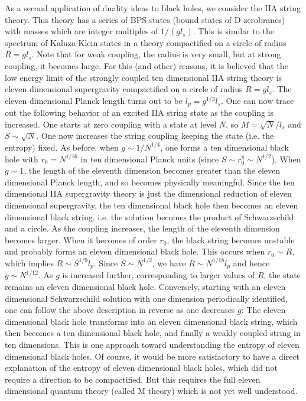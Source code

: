 As a second application of duality ideas to black holes, we consider
the IIA string theory. This theory has a series of BPS states (bound
states of D-zerobranes) with
masses which are integer multiples of $1/(g l_s)$. This is similar to
the spectrum of Kaluza-Klein states in a theory compactified on a 
circle of radius $R = g l_s$. Note that for weak coupling, the radius is very
small, but at strong coupling, it becomes large. For this (and other) 
reasons, it is believed that the low energy limit of the strongly
coupled ten dimensional IIA string theory is eleven dimensional supergravity
compactified on a circle of radius $R = g l_s$. The eleven dimensional
Planck length turns out to be $l_p = g^{1/3} l_s$. One
can now trace out the following behavior of an excited IIA string state as
the coupling is increased. One starts at zero coupling with a
state at level $N$, so $M= \sqrt N/l_s$ and $S\sim \sqrt N$.
One now increases the string coupling keeping the state (i.e. the entropy)
fixed. As before,
when $g\sim 1/N^{1/4}$, one forms a ten dimensional black hole with
$r_0 = N^{1/16}$ in ten dimensional Planck units (since $S \sim r_0^8 \sim
N^{1/2}$). When $g\sim 1$, the length of the eleventh dimension becomes
greater than the eleven dimensional Planck length, and so becomes
physically meaningful. Since the ten dimensional IIA supergravity theory
is just the dimensional reduction of eleven dimensional supergravity,
the ten dimensional black hole then becomes
an eleven dimensional black string, i.e. the solution becomes the product
of Schwarzschild and a circle. As the coupling increases, the
length of the eleventh dimension becomes larger. 
When it becomes of
order $r_0$, the black string becomes unstable \cite{grla} and probably 
forms an eleven dimensional
black hole.  This occurs when $r_0 \sim R$, which implies $R
\sim S^{1/9} l_p$. Since $S\sim N^{1/2}$, we have $R \sim N^{1/18} l_p$
and hence $g\sim N^{1/12}$. As $g$ is increased further, corresponding 
to larger values of $R$, the state remains an eleven dimensional
black hole. Conversely, starting with an eleven dimensional Schwarzschild
solution with one dimension periodically identified, one can follow the
above description in reverse as one decreases $g$: The eleven
dimensional black hole transforms into an eleven dimensional black string,
which then becomes a ten dimensional black hole, and finally 
a weakly coupled string in ten dimensions. This is one approach toward
understanding the entropy of eleven dimensional black holes. Of course,
it would be more satisfactory to have a direct explanation of the
entropy of eleven dimensional
black holes, which did not require a  direction to be compactified.
But this requires the full eleven dimensional quantum theory (called M theory)
which is
not yet well understood.


